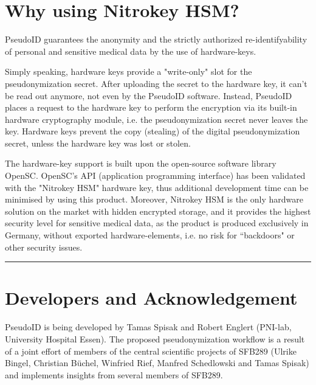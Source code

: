 \section{Why using Nitrokey HSM?}
PseudoID guarantees the anonymity and the strictly authorized re-identifyability of personal and sensitive medical data by the use of hardware-keys.

Simply speaking, hardware keys provide a "write-only" slot for the pseudonymization secret. After uploading the secret to the hardware key, it can't be read out anymore, not even by the PseudoID software. Instead, PseudoID places a request to the hardware key to perform the encryption via its built-in hardware cryptography module, i.e. the pseudonymization secret never leaves the key. Hardware keys prevent the copy (stealing) of the digital pseudonymization secret, unless the hardware key was lost or stolen.

The hardware-key support is built upon the open-source software library OpenSC. OpenSC's API (application programming interface) has been validated with the "Nitrokey HSM" hardware key, thus additional development time can be minimised by using this product. Moreover, Nitrokey HSM is the only hardware solution on the market with hidden encrypted storage, and it provides the highest security level for sensitive medical data, as the product is produced exclusively in Germany, without exported hardware-elements, i.e. no risk for “backdoors" or other security issues.


\par\noindent\rule{\textwidth\color{pniblue}}{0.4pt}
\section{Developers and Acknowledgement}
PseudoID is being developed by Tamas Spisak and Robert Englert (PNI-lab, University Hospital Essen). The proposed pseudonymization workflow is a result of a joint effort of members of the central scientific projects of SFB289 (Ulrike Bingel, Christian Büchel, Winfried Rief, Manfred Schedlowski and Tamas Spisak) and implements insights from several members of SFB289.